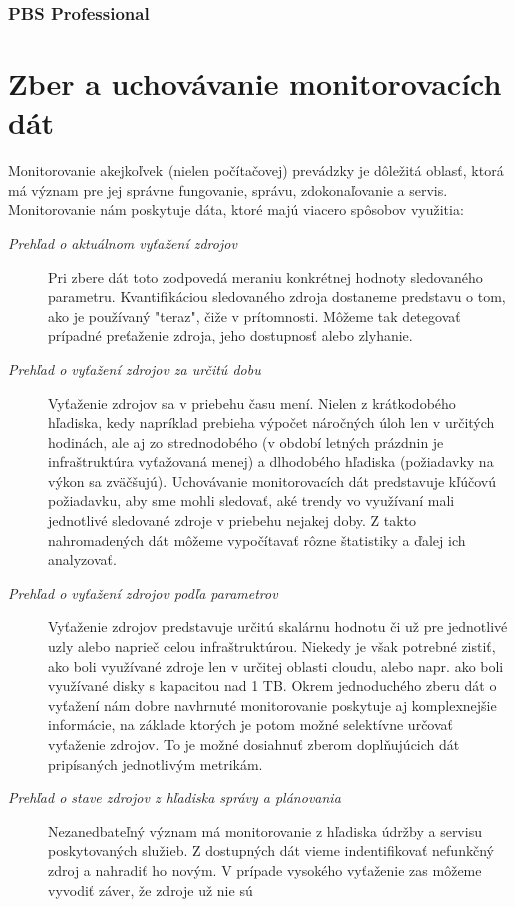\documentclass[12pt,twoside,color,cover,table]{fithesis3}
\begin{document}
\subsection{PBS Professional}

\chapter{Zber a uchovávanie monitorovacích dát}
Monitorovanie akejkoľvek (nielen počítačovej) prevádzky je dôležitá oblasť, ktorá má význam pre jej správne fungovanie, správu, zdokonaľovanie a servis. Monitorovanie nám poskytuje dáta, ktoré majú viacero 
spôsobov využitia:
\begin{description}
\item[\emph{Prehľad o aktuálnom vyťažení zdrojov}]
Pri zbere dát toto zodpovedá meraniu konkrétnej hodnoty sledovaného parametru. Kvantifikáciou sledovaného zdroja dostaneme predstavu o tom, ako je používaný "teraz", čiže v prítomnosti. Môžeme tak detegovať prípadné
preťaženie zdroja, jeho dostupnosť alebo zlyhanie.
\item[\emph{Prehľad o vyťažení zdrojov za určitú dobu}]
Vyťaženie zdrojov sa v priebehu času mení. Nielen z krátkodobého hľadiska, kedy napríklad prebieha výpočet náročných úloh len v určitých hodinách, ale aj zo strednodobého (v období letných prázdnin je infraštruktúra 
vyťažovaná menej) a dlhodobého hľadiska (požiadavky na výkon sa zväčšujú). Uchovávanie monitorovacích dát predstavuje kľúčovú požiadavku, aby sme mohli sledovať, aké trendy vo využívaní mali jednotlivé sledované zdroje v priebehu nejakej doby.
Z takto nahromadených dát môžeme vypočítavať rôzne štatistiky a ďalej ich analyzovať.
\item[\emph{Prehľad o vyťažení zdrojov podľa parametrov}]
Vyťaženie zdrojov predstavuje určitú skalárnu hodnotu či už pre jednotlivé uzly alebo naprieč celou infraštruktúrou. Niekedy je však potrebné zistiť, ako boli využívané zdroje len v určitej oblasti cloudu,
alebo napr. ako boli využívané disky s kapacitou nad 1 TB. Okrem jednoduchého zberu dát o vyťažení nám dobre navhrnuté monitorovanie poskytuje aj komplexnejšie informácie, na základe ktorých je potom možné
selektívne určovať vyťaženie zdrojov. To je možné dosiahnuť zberom doplňujúcich dát pripísaných jednotlivým metrikám.
\item[\emph{Prehľad o stave zdrojov z hľadiska správy a plánovania}]
Nezanedbateľný význam má monitorovanie z hľadiska údržby a servisu poskytovaných služieb. Z dostupných dát vieme indentifikovať nefunkčný zdroj a nahradiť ho novým. V prípade vysokého vyťaženie zas môžeme vyvodiť záver, že zdroje už nie sú

\end{description}
\end{document}
